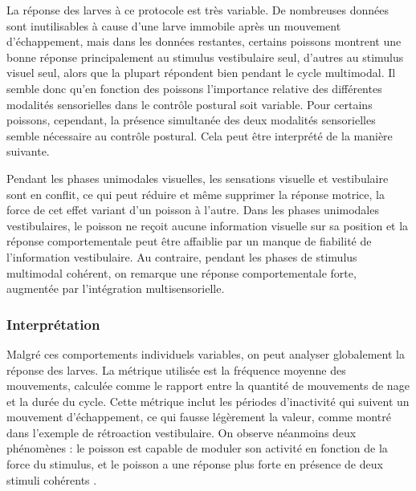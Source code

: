 La réponse des larves à ce protocole est très variable. De nombreuses données sont inutilisables à cause d'une larve immobile après un mouvement d'échappement, mais dans les données restantes, certains poissons montrent une bonne réponse principalement au stimulus vestibulaire seul, d'autres au stimulus visuel seul, alors que la plupart répondent bien pendant le cycle multimodal. Il semble donc qu'en fonction des poissons l'importance relative des différentes modalités sensorielles dans le contrôle postural soit variable. Pour certains poissons, cependant, la présence simultanée des deux modalités sensorielles semble nécessaire au contrôle postural. Cela peut être interprété de la manière suivante.

Pendant les phases unimodales visuelles, les sensations visuelle et vestibulaire sont en conflit, ce qui peut réduire et même supprimer la réponse motrice, la force de cet effet variant d'un poisson à l'autre. Dans les phases unimodales vestibulaires, le poisson ne reçoit aucune information visuelle sur sa position et la réponse comportementale peut être affaiblie par un manque de fiabilité de l'information vestibulaire. Au contraire, pendant les phases de stimulus multimodal cohérent, on remarque une réponse comportementale forte, augmentée par l'intégration multisensorielle.


\subsubsection{Interprétation}
Malgré ces comportements individuels variables, on peut analyser globalement la réponse des larves. La métrique utilisée est la fréquence moyenne des mouvements, calculée comme le rapport entre la quantité de mouvements de nage et la durée du cycle. Cette métrique inclut les périodes d'inactivité qui suivent un mouvement d'échappement, ce qui fausse légèrement la valeur, comme montré dans l'exemple de rétroaction vestibulaire. On observe néanmoins deux phénomènes : le poisson est capable de moduler son activité en fonction de la force du stimulus, et le poisson a une réponse plus forte en présence de deux stimuli cohérents .


